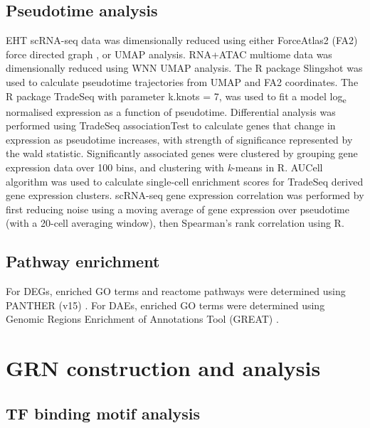 \subsection{\label{ch2:pseudo}Pseudotime analysis}

EHT scRNA-seq data was dimensionally reduced using either ForceAtlas2 (FA2) force directed graph \citep{jacomy_forceatlas2_2014}, or UMAP analysis. RNA+ATAC multiome data was dimensionally reduced using WNN UMAP analysis. The R package Slingshot \citep{street_slingshot_2018} was used to calculate pseudotime trajectories from UMAP and FA2 coordinates. The R package TradeSeq \citep{van_den_berge_trajectory-based_2020} with parameter k.knots = 7, was used to fit a model log\textsubscript{e} normalised expression as a function of pseudotime. Differential analysis was performed using TradeSeq associationTest to calculate genes that change in expression as pseudotime increases, with strength of significance represented by the wald statistic. Significantly associated genes were clustered by grouping gene expression data over 100 bins, and clustering with \textit{k}-means in R. AUCell algorithm \citep{aibar_scenic_2017} was used to calculate single-cell enrichment scores for TradeSeq derived gene expression clusters. scRNA-seq gene expression correlation was performed by first reducing noise using a moving average of gene expression over pseudotime (with a 20-cell averaging window), then Spearman's rank correlation using R. 

\subsection{Pathway enrichment}

For DEGs, enriched GO terms and reactome pathways were determined using PANTHER (v15) \citep{thomas_panther_2003}. For DAEs, enriched GO terms were determined using Genomic Regions Enrichment of Annotations Tool (GREAT) \citep{mclean_great_2010}. 


\section{GRN construction and analysis}

\subsection{\label{ch2:motifs}TF binding motif analysis}

